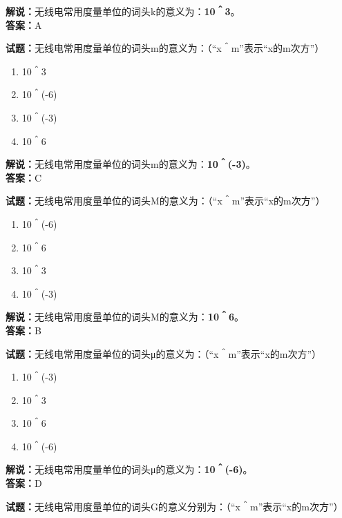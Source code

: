 \documentclass{ctexbook}
\begin{document}
\noindent\textbf{解说：}无线电常用度量单位的词头k的意义为：\textbf{10＾3}。\\\noindent\textbf{答案：}A


\bigskip


\noindent\textbf{试题：}无线电常用度量单位的词头m的意义为：（“x＾m”表示“x的m次方”）

\begin{enumerate}[leftmargin=3em]
	\item 10＾3
	\item 10＾(-6)
	\item 10＾(-3)
	\item 10＾6
\end{enumerate}

\noindent\textbf{解说：}无线电常用度量单位的词头m的意义为：\textbf{10＾(-3)}。\\\noindent\textbf{答案：}C


\bigskip


\noindent\textbf{试题：}无线电常用度量单位的词头M的意义为：（“x＾m”表示“x的m次方”）

\begin{enumerate}[leftmargin=3em]
	\item 10＾(-6)
	\item 10＾6
	\item 10＾3
	\item 10＾(-3)
\end{enumerate}

\noindent\textbf{解说：}无线电常用度量单位的词头M的意义为：\textbf{10＾6}。\\\noindent\textbf{答案：}B


\bigskip


\noindent\textbf{试题：}无线电常用度量单位的词头μ的意义为：（“x＾m”表示“x的m次方”）

\begin{enumerate}[leftmargin=3em]
	\item 10＾(-3)
	\item 10＾3
	\item 10＾6
	\item 10＾(-6)
\end{enumerate}

\noindent\textbf{解说：}无线电常用度量单位的词头μ的意义为：\textbf{10＾(-6)}。\\\noindent\textbf{答案：}D


\bigskip


\noindent\textbf{试题：}无线电常用度量单位的词头G的意义分别为：（“x＾m”表示“x的m次方”）
\end{document}
